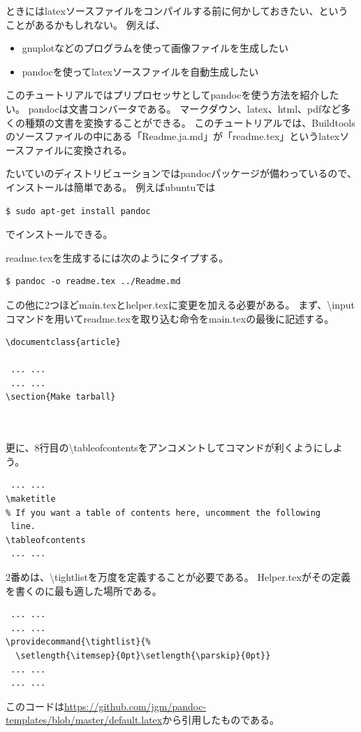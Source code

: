 ときにはlatexソースファイルをコンパイルする前に何かしておきたい、ということがあるかもしれない。
例えば、
\begin{itemize}
\item gnuplotなどのプログラムを使って画像ファイルを生成したい
\item pandocを使ってlatexソースファイルを自動生成したい
\end{itemize}

このチュートリアルではプリプロセッサとしてpandocを使う方法を紹介したい。
pandocは文書コンバータである。
マークダウン、latex、html、pdfなど多くの種類の文書を変換することができる。
このチュートリアルでは、Buildtoolsのソースファイルの中にある「Readme.ja.md」が「readme.tex」というlatexソースファイルに変換される。

たいていのディストリビューションではpandocパッケージが備わっているので、インストールは簡単である。
例えばubuntuでは
\begin{verbatim}
$ sudo apt-get install pandoc
\end{verbatim}
でインストールできる。

readme.texを生成するには次のようにタイプする。
\begin{verbatim}
$ pandoc -o readme.tex ../Readme.md
\end{verbatim}

この他に2つほどmain.texとhelper.texに変更を加える必要がある。
まず、{\textbackslash}inputコマンドを用いてreadme.texを取り込む命令をmain.texの最後に記述する。
\begin{verbatim}
\documentclass{article}

 ... ...
 ... ...
\section{Make tarball}
  


\end{verbatim}
更に、8行目の{\textbackslash}tableofcontentsをアンコメントしてコマンドが利くようにしよう。
\begin{verbatim}
 ... ...
\maketitle
% If you want a table of contents here, uncomment the following
 line.
\tableofcontents
 ... ...
\end{verbatim}

2番めは、{\textbackslash}tightlistを万度を定義することが必要である。
Helper.texがその定義を書くのに最も適した場所である。
\begin{verbatim}
 ... ...
 ... ...
\providecommand{\tightlist}{%
  \setlength{\itemsep}{0pt}\setlength{\parskip}{0pt}}
 ... ...
 ... ...
\end{verbatim}
このコードは\url{https://github.com/jgm/pandoc-templates/blob/master/default.latex}から引用したものである。

